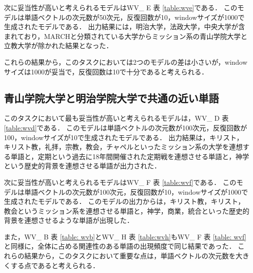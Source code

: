 次に妥当性が高いと考えられるモデルはWV\_ E 表 \ref{table:wve}である．
このモデルは単語ベクトルの次元数が50次元，反復回数が10，windowサイズが1000で生成されたモデルである．
出力結果には，明治大学，法政大学，中央大学が含まれており，MARCHと分類されている大学からミッション系の青山学院大学と立教大学が除かれた結果となった．

これらの結果から，このタスクにおいては2つのモデルの差は小さいが，windowサイズは1000が妥当で，反復回数は10で十分であると考えられる．

\subsection{青山学院大学と明治学院大学で共通の近い単語}
このタスクにおいて最も妥当性が高いと考えられるモデルは，WV\_ D 表 \ref{table:wvd}である．
このモデルは単語ベクトルの次元数が100次元，反復回数が100，windowサイズが10で生成されたモデルである．
出力結果は，キリスト，キリスト教，礼拝，宗教，教会，チャペルといったミッション系の大学を連想する単語と，定期という過去に18年間開催された定期戦を連想させる単語と，神学という歴史的背景を連想させる単語が出力された．

次に妥当性が高いと考えられるモデルはWV\_ F 表 \ref{table:wvf}である．
このモデルは単語ベクトルの次元数が100次元，反復回数が10，windowサイズが1000で生成されたモデルである．
このモデルの出力からは，キリスト教，キリスト，教会というミッション系を連想させる単語と，神学，商業，統合といった歴史的背景を連想させるような単語が出現した．

また，WV\_ B 表 \ref{table: wvb}とWV\_ H 表 \ref{table:wvh}もWV\_ F 表 \ref{table: wvf}と同様に，全体に占める関連性のある単語の出現頻度で同じ結果であった．
これらの結果から，このタスクにおいて重要な点は，単語ベクトルの次元数を大きくする点であると考えられる．

